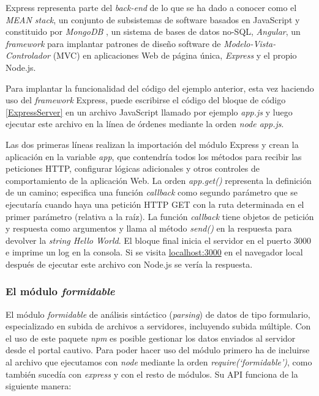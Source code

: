 Express representa parte del \emph{back-end} de lo que se ha dado a conocer como el \emph{\acrshort{MEAN} stack}, un conjunto de subsistemas de software basados en JavaScript y constituido por \emph{MongoDB} \cite{MongoDB}, un sistema de bases de datos no-SQL, \emph{Angular}, un \emph{framework} para implantar patrones de diseño software de \emph{Modelo-Vista-Controlador} (MVC) en aplicaciones Web de página única, \emph{Express} y el propio Node.js.

Para implantar la funcionalidad del código del ejemplo anterior, esta vez haciendo uso del \emph{framework} Express, puede escribirse el código del bloque de código \ref{ExpressServer} en un archivo JavaScript llamado por ejemplo \emph{app.js} y luego ejecutar este archivo en la línea de órdenes mediante la orden \emph{node app.js}.



Las dos primeras líneas realizan la importación del módulo Express y crean la aplicación en la variable \emph{app}, que contendría todos los métodos para recibir las peticiones HTTP, configurar lógicas adicionales y otros controles de comportamiento de la aplicación Web. La orden \emph{app.get()} representa la definición de un camino; especifica una función \emph{callback} como segundo parámetro que se ejecutaría cuando haya una petición HTTP GET con la ruta determinada en el primer parámetro (relativa a la raíz). La función \emph{callback} tiene objetos de petición y respuesta como argumentos y llama al método \emph{send()} en la respuesta para devolver la \emph{string Hello World}. El bloque final inicia el servidor en el puerto 3000 e imprime un log en la consola. Si se visita \url{localhost:3000} en el navegador local después de ejecutar este archivo con Node.js se vería la respuesta.

\subsubsection{El módulo \emph{formidable}}
El módulo \emph{formidable} de análisis sintáctico (\emph{parsing}) de datos de tipo formulario, especializado en subida de archivos a servidores, incluyendo subida múltiple. Con el uso de este paquete \emph{npm} es posible gestionar los datos enviados al servidor desde el portal cautivo.
Para poder hacer uso del módulo primero ha de incluirse al archivo que ejecutamos con \emph{node} mediante la orden \emph{require(‘formidable’)}, como también sucedía con \emph{express} y con el resto de módulos. Su API funciona de la siguiente manera:

